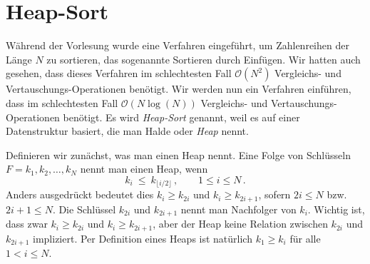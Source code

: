 \documentclass[tikz,12pt]{article}
\begin{document}
\section{Heap-Sort}

Während der Vorlesung wurde eine Verfahren eingeführt, um Zahlenreihen der Länge $N$ zu sortieren, das sogenannte Sortieren durch Einfügen.
Wir hatten auch gesehen, dass dieses Verfahren im schlechtesten Fall $\mathcal{O}(N^2)$ Vergleichs- und Vertauschungs-Operationen benötigt.
Wir werden nun ein Verfahren einführen, dass im schlechtesten Fall $\mathcal{O}(N\log(N))$ Vergleichs- und Vertauschungs-Operationen benötigt.
Es wird \emph{Heap-Sort} genannt, weil es auf einer Datenstruktur basiert, die man Halde oder \emph{Heap} nennt. 

Definieren wir zunächst, was man einen Heap nennt.
Eine Folge von Schlüsseln $F = k_1, k_2, \ldots, k_{N}$ nennt man einen Heap, wenn
\[
k_i \ \leq\ k_{\lfloor i/2 \rfloor}\,,\qquad 1\leq i \leq N\,.
\]
Anders ausgedrückt bedeutet dies $k_i \geq k_{2i}$ und $k_i\geq k_{2i+1}$, sofern $2i\leq N$ bzw. $2i+1\leq N$. 
Die Schlüssel $k_{2i}$ und $k_{2i+1}$ nennt man Nachfolger von $k_i$. 
Wichtig ist, dass zwar $k_i \geq k_{2i}$ und $k_i\geq k_{2i+1}$, aber der Heap keine Relation zwischen $k_{2i}$ und $k_{2i+1}$ impliziert. 
Per Definition eines Heaps ist natürlich $k_1 \geq k_i$ für alle $1 < i \leq N$. 
\end{document}
